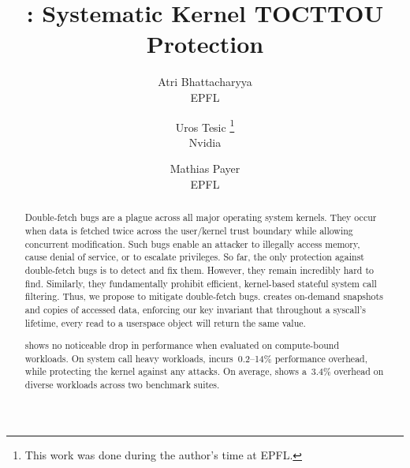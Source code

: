 \documentclass[letterpaper,twocolumn,10pt]{article}
\begin{document}
\newcommand{\footremember}[2]{%
   \footnote{#2}
    \newcounter{#1}
    \setcounter{#1}{\value{footnote}}%
}
\newcommand{\footrecall}[1]{%
    \footnotemark[\value{#1}]%
}

\date{}

\title{\Large \bf \midas: Systematic Kernel TOCTTOU Protection}

\author{
{\rm Atri Bhattacharyya} \\
EPFL
\and
{\rm Uros Tesic} \thanks{This work was done during the author's time at EPFL.}\\
Nvidia
\and
{\rm Mathias Payer}\\
EPFL
} %
\maketitle

\begin{abstract}
Double-fetch bugs are a plague across all major operating system kernels. They
occur when data is fetched twice across the user/kernel trust boundary while
allowing concurrent modification. Such bugs enable an attacker to illegally
access memory, cause denial of service, or to escalate privileges.
%
So far, the only protection against double-fetch bugs is to detect and fix them.
However, they remain incredibly hard to find.
%
Similarly,
they fundamentally prohibit efficient, kernel-based stateful system call filtering.
Thus, we propose \emph{\midas} to mitigate double-fetch bugs. \midas creates on-demand
snapshots and copies of accessed data, enforcing our key invariant
that throughout a syscall's lifetime, every read to a userspace object
will return the same value.

\midas shows no noticeable drop in performance when evaluated on compute-bound
workloads. On system call heavy workloads, \midas incurs~0.2--14\%
performance overhead, while protecting the kernel
against any \tocttou attacks. On average, \midas shows a~$3.4\%$ overhead on
diverse workloads across two benchmark suites.

\end{abstract}
\end{document}
